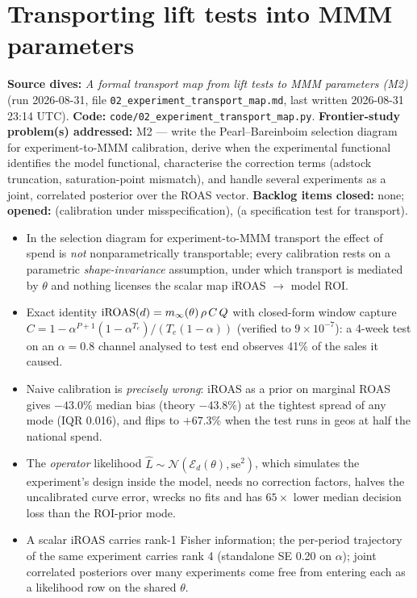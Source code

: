 \chapter{Transporting lift tests into MMM parameters}
\label{ch:transport}

\begin{provenance}
\textbf{Source dives:}  \emph{A formal transport map from lift tests to MMM parameters (M2)} (run 2026-08-31, file \texttt{02\_experiment\_transport\_map.md}, last written 2026-08-31 23:14 UTC).
\textbf{Code:} \texttt{code/02\_experiment\_transport\_map.py}.
\textbf{Frontier-study problem(s) addressed:} M2 --- write the Pearl--Bareinboim selection diagram for experiment-to-MMM calibration, derive when the experimental functional identifies the model functional, characterise the correction terms (adstock truncation, saturation-point mismatch), and handle several experiments as a joint, correlated posterior over the ROAS vector.
\textbf{Backlog items closed:} none; \textbf{opened:}  (calibration under misspecification),  (a specification test for transport).
\end{provenance}

\begin{keyideas}
\begin{itemize}
\item In the selection diagram for experiment-to-MMM transport the effect of spend is \emph{not} nonparametrically transportable; every calibration rests on a parametric \emph{shape-invariance} assumption, under which transport is mediated by $\theta$ and nothing licenses the scalar map iROAS $\to$ model ROI.
\item Exact identity $\mathrm{iROAS}(d) = m_\infty(\theta)\,\rho\,C\,Q$ with closed-form window capture $C = 1 - \alpha^{P+1}(1-\alpha^{T_e})/(T_e(1-\alpha))$ (verified to $9\times10^{-7}$): a 4-week test on an $\alpha = 0.8$ channel analysed to test end observes 41\% of the sales it caused.
\item Naive calibration is \emph{precisely wrong}: iROAS as a prior on marginal ROAS gives $-43.0\%$ median bias (theory $-43.8\%$) at the tightest spread of any mode (IQR 0.016), and flips to $+67.3\%$ when the test runs in geos at half the national spend.
\item The \emph{operator} likelihood $\hat L \sim \mathcal N(\mathcal E_d(\theta), \mathrm{se}^2)$, which simulates the experiment's design inside the model, needs no correction factors, halves the uncalibrated curve error, wrecks no fits and has $65\times$ lower median decision loss than the ROI-prior mode.
\item A scalar iROAS carries rank-1 Fisher information; the per-period trajectory of the same experiment carries rank 4 (standalone SE 0.20 on $\alpha$); joint correlated posteriors over many experiments come free from entering each as a likelihood row on the shared $\theta$.
\end{itemize}
\end{keyideas}

